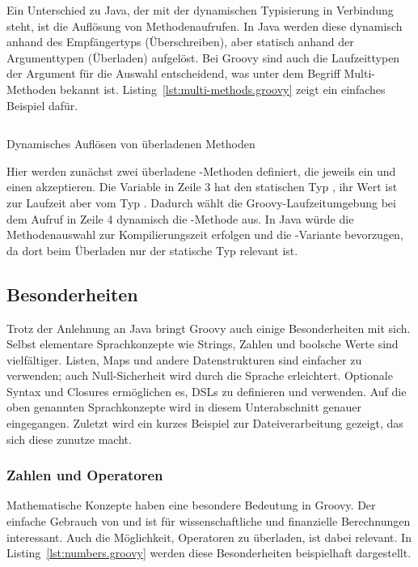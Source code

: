\documentclass[a4paper]{article}
\newcommand{\codelisting}[3]{\begin{listing}[htp]
	\inputminted{#1}{#1/#2}
	\vspace{-3ex}
	\caption{#3}
	\label{lst:#2}
\end{listing}}
\begin{document}
Ein Unterschied zu Java, der mit der dynamischen Typisierung in Verbindung steht, ist die Auflösung von Methodenaufrufen.
In Java werden diese dynamisch anhand des Empfängertyps (Überschreiben), aber statisch anhand der Argumenttypen (Überladen) aufgelöst.
Bei Groovy sind auch die Laufzeittypen der Argument für die Auswahl entscheidend, was unter dem Begriff Multi-Methoden bekannt ist.
Listing~\ref{lst:multi-methods.groovy} zeigt ein einfaches Beispiel dafür.

\codelisting{groovy}{multi-methods.groovy}{Dynamisches Auflösen von überladenen Methoden}

Hier werden zunächst zwei überladene -Methoden definiert, die jeweils ein  und einen  akzeptieren.
Die Variable in Zeile 3 hat den statischen Typ , ihr Wert ist zur Laufzeit aber vom Typ .
Dadurch wählt die Groovy-Laufzeitumgebung bei dem Aufruf in Zeile 4 dynamisch die -Methode aus.
In Java würde die Methodenauswahl zur Kompilierungszeit erfolgen und die -Variante bevorzugen, da dort beim Überladen nur der statische Typ relevant ist.

\subsection{Besonderheiten}\label{subsec:besonderheiten}

Trotz der Anlehnung an Java bringt Groovy auch einige Besonderheiten mit sich.
Selbst elementare Sprachkonzepte wie Strings, Zahlen und boolsche Werte sind vielfältiger.
Listen, Maps und andere Datenstrukturen sind einfacher zu verwenden; auch Null-Sicherheit wird durch die Sprache erleichtert.
Optionale Syntax und Closures ermöglichen es, DSLs zu definieren und verwenden.
Auf die oben genannten Sprachkonzepte wird in diesem Unterabschnitt genauer eingegangen.
Zuletzt wird ein kurzes Beispiel zur Dateiverarbeitung gezeigt, das sich diese zunutze macht.

\subsubsection{Zahlen und Operatoren}\label{subsubsec:zahlen}

Mathematische Konzepte haben eine besondere Bedeutung in Groovy.
Der einfache Gebrauch von \break{} und  ist für wissenschaftliche und finanzielle Berechnungen interessant.
Auch die Möglichkeit, Operatoren zu überladen, ist dabei relevant.
In Listing~\ref{lst:numbers.groovy} werden diese Besonderheiten beispielhaft dargestellt.
\end{document}

